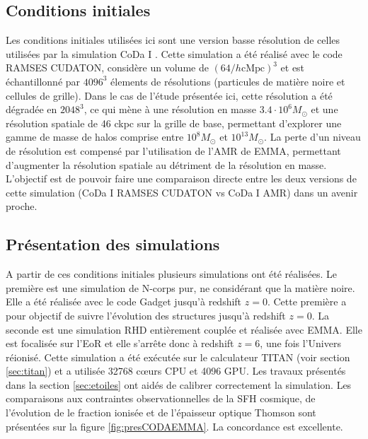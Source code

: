 \subsection{Conditions initiales}


Les conditions initiales utilisées ici sont une version basse résolution de celles utilisées par la simulation \ac{CoDa} I \citep{ocvirk_cosmic_2015}.
Cette simulation a été réalisé avec le code RAMSES CUDATON, %
considère un volume de $\left( 64/h \mathrm{cMpc} \right)^3$ et est échantillonné par $4096^3$ élements de résolutions (particules de matière noire et cellules de grille).
Dans le cas de l'étude présentée ici, cette résolution a été dégradée en $2048^3$, ce qui mène à une résolution en masse $3.4 \cdot 10^6 M_\odot$ et une résolution spatiale de 46 ckpc sur la grille de base, permettant d'explorer une gamme de masse de halos comprise entre $10^8 M_\odot$ et $10^{13}M_\odot$.
La perte d'un niveau de résolution est compensé par l'utilisation de l'\ac{AMR} de EMMA, permettant d’augmenter la résolution spatiale au détriment de la résolution en masse.
L'objectif est de pouvoir faire une comparaison directe entre les deux versions de cette simulation (CoDa I RAMSES CUDATON vs CoDa I AMR) dans un avenir proche.


\subsection{Présentation des simulations}

A partir de ces conditions initiales plusieurs simulations ont été réalisées.
Le première est une simulation de N-corps pur, ne considérant que la matière noire.
Elle a été réalisée avec le code Gadget \citep{springel_cosmological_2005} jusqu'à redshift $z=0$.
Cette première a pour objectif de suivre l'évolution des structures jusqu'à redshift $z=0$.
La seconde est une simulation \ac{RHD} entièrement couplée et réalisée avec EMMA.
Elle est focalisée sur l'\ac{EoR} et elle s’arrête donc à redshift $z=6$, une fois l'Univers réionisé.
Cette simulation a été exécutée sur le calculateur TITAN (voir section \ref{sec:titan}) et a utilisée 32768 cœurs \ac{CPU} et 4096 \ac{GPU}.
Les travaux présentés dans la section \ref{sec:etoiles} ont aidés de calibrer correctement la simulation.
Les comparaisons aux contraintes observationnelles de la \ac{SFH} cosmique, de l'évolution de le fraction ionisée et de l'épaisseur optique Thomson sont présentées sur la figure \ref{fig:presCODAEMMA}. 
La concordance est excellente.

